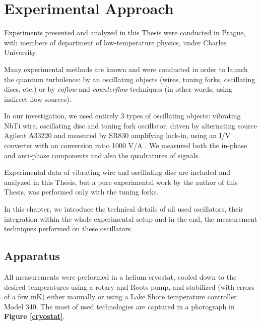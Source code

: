 \chapter{Experimental Approach}

Experiments presented and analyzed in this Thesis were conducted in Prague, with members of department of low-temperature physics, under Charles University.

Many experimental methods are known and were conducted in order to launch the quantum turbulence: by an oscillating objects (wires, tuning forks, oscillating discs, etc.) or by \textit{coflow} and \textit{counterflow} techniques (in other words, using indirect flow sources).

In our investigation, we used entirely 3 types of oscillating objects: vibrating NbTi wire, oscillating disc and tuning fork oscillator, driven by alternating source Agilent A33220 and measured by SR830 amplifying lock-in, using an I/V converter with an conversion ratio 1000 V/A \cite{skyba}. We measured both the in-phase and anti-phase components and also the quadratures of signals.

Experimental data of vibrating wire and oscillating disc are included and analyzed in this Thesis, but a pure experimental work by the author of this Thesis, was performed only with the tuning forks.

In this chapter, we introduce the technical details of all used oscillators, their integration within the whole experimental setup and in the end, the measurement techniques performed on these oscillators.

\newpage

\section{Apparatus}

All measurements were performed in a helium cryostat, cooled down to the desired temperatures using a rotary and Roots pump, and stabilized (with errors of a few mK) either manually or using a Lake Shore temperature controller Model 340. The most of used technologies are captured in a photograph in \textbf{Figure \ref{cryostat}}.

